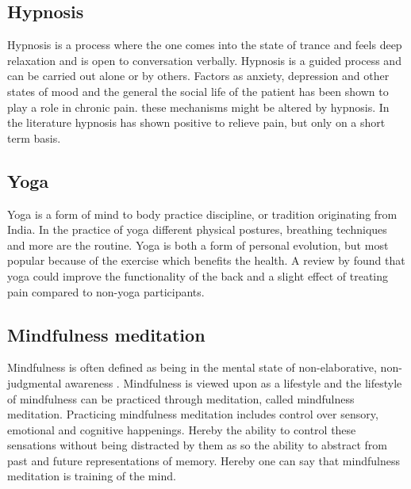 \subsection{Hypnosis}
Hypnosis is a process where the one comes into the state of trance and feels deep relaxation and is open to conversation verbally. Hypnosis is a guided process and can be carried out alone or by others. \cite{Gerald2013} Factors as anxiety, depression and other states of mood and the general the social life of the patient has been shown to play a role in chronic pain. these mechanisms might be altered by hypnosis.
In the literature hypnosis has shown positive to relieve pain, but only on a short term basis. \cite{Dhanani2011}

\subsection{Yoga}
Yoga is a form of mind to body practice discipline, or tradition originating from India. In the practice of yoga different physical postures, breathing techniques and more are the routine. 
Yoga is both a form of personal evolution, but most popular because of the exercise which benefits the health.
A review by \cite{Whitehead2017} found that yoga could improve the functionality of the back and a slight effect of treating pain compared to non-yoga participants. 

\subsection{Mindfulness meditation}
Mindfulness is often defined as being in the mental state of non-elaborative, non-judgmental awareness \cite{Zeidan2012,Zeidan2016,Tang2017}. 
Mindfulness is viewed upon as a lifestyle and the lifestyle of mindfulness can be practiced through meditation, called mindfulness meditation. Practicing mindfulness meditation includes control over sensory, emotional and cognitive happenings. Hereby the ability to control these sensations without being distracted by them as so the ability to abstract from past and future representations of memory. Hereby one can say that mindfulness meditation is training of the mind. \cite{Tang2017}


